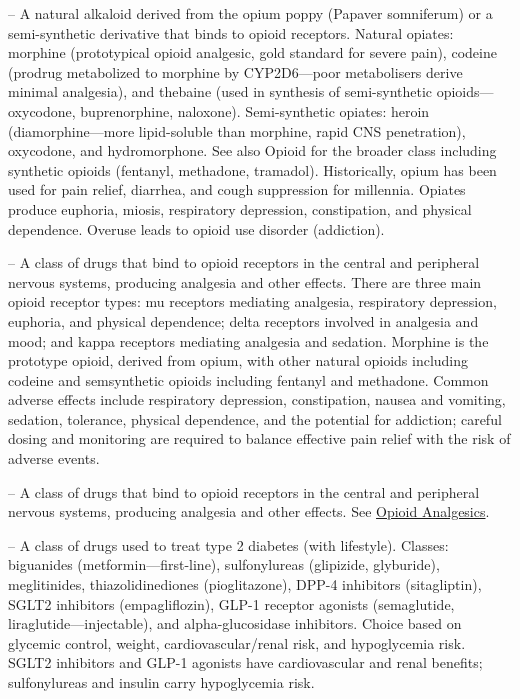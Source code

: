 -- A natural alkaloid derived from the opium poppy (Papaver somniferum) or a semi-synthetic derivative that binds to opioid receptors. Natural opiates: morphine (prototypical opioid analgesic, gold standard for severe pain), codeine (prodrug metabolized to morphine by CYP2D6—poor metabolisers derive minimal analgesia), and thebaine (used in synthesis of semi-synthetic opioids—oxycodone, buprenorphine, naloxone). Semi-synthetic opiates: heroin (diamorphine—more lipid-soluble than morphine, rapid CNS penetration), oxycodone, and hydromorphone. See also Opioid for the broader class including synthetic opioids (fentanyl, methadone, tramadol). Historically, opium has been used for pain relief, diarrhea, and cough suppression for millennia. Opiates produce euphoria, miosis, respiratory depression, constipation, and physical dependence. Overuse leads to opioid use disorder (addiction).

-- A class of drugs that bind to opioid receptors in the central and peripheral nervous systems, producing analgesia and other effects. There are three main opioid receptor types: mu receptors mediating analgesia, respiratory depression, euphoria, and physical dependence; delta receptors involved in analgesia and mood; and kappa receptors mediating analgesia and sedation. Morphine is the prototype opioid, derived from opium, with other natural opioids including codeine and semsynthetic opioids including fentanyl and methadone. Common adverse effects include respiratory depression, constipation, nausea and vomiting, sedation, tolerance, physical dependence, and the potential for addiction; careful dosing and monitoring are required to balance effective pain relief with the risk of adverse events.

-- A class of drugs that bind to opioid receptors in the central and peripheral nervous systems, producing analgesia and other effects. See \hyperlink{Opioid Analgesics}{Opioid Analgesics}.

-- A class of drugs used to treat type 2 diabetes (with lifestyle). Classes: biguanides (metformin—first-line), sulfonylureas (glipizide, glyburide), meglitinides, thiazolidinediones (pioglitazone), DPP-4 inhibitors (sitagliptin), SGLT2 inhibitors (empagliflozin), GLP-1 receptor agonists (semaglutide, liraglutide—injectable), and alpha-glucosidase inhibitors. Choice based on glycemic control, weight, cardiovascular/renal risk, and hypoglycemia risk. SGLT2 inhibitors and GLP-1 agonists have cardiovascular and renal benefits; sulfonylureas and insulin carry hypoglycemia risk.

